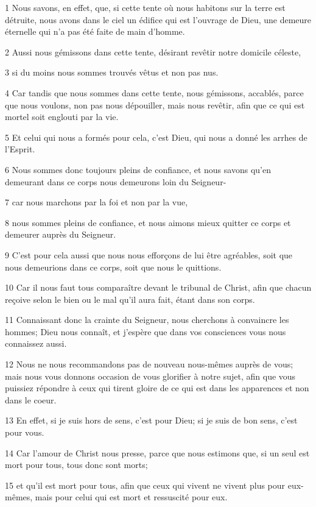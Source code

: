 \par 1 Nous savons, en effet, que, si cette tente où nous habitons sur la terre est détruite, nous avons dans le ciel un édifice qui est l'ouvrage de Dieu, une demeure éternelle qui n'a pas été faite de main d'homme.
\par 2 Aussi nous gémissons dans cette tente, désirant revêtir notre domicile céleste,
\par 3 si du moins nous sommes trouvés vêtus et non pas nus.
\par 4 Car tandis que nous sommes dans cette tente, nous gémissons, accablés, parce que nous voulons, non pas nous dépouiller, mais nous revêtir, afin que ce qui est mortel soit englouti par la vie.
\par 5 Et celui qui nous a formés pour cela, c'est Dieu, qui nous a donné les arrhes de l'Esprit.
\par 6 Nous sommes donc toujours pleins de confiance, et nous savons qu'en demeurant dans ce corps nous demeurons loin du Seigneur-
\par 7 car nous marchons par la foi et non par la vue,
\par 8 nous sommes pleins de confiance, et nous aimons mieux quitter ce corps et demeurer auprès du Seigneur.
\par 9 C'est pour cela aussi que nous nous efforçons de lui être agréables, soit que nous demeurions dans ce corps, soit que nous le quittions.
\par 10 Car il nous faut tous comparaître devant le tribunal de Christ, afin que chacun reçoive selon le bien ou le mal qu'il aura fait, étant dans son corps.
\par 11 Connaissant donc la crainte du Seigneur, nous cherchons à convaincre les hommes; Dieu nous connaît, et j'espère que dans vos consciences vous nous connaissez aussi.
\par 12 Nous ne nous recommandons pas de nouveau nous-mêmes auprès de vous; mais nous vous donnons occasion de vous glorifier à notre sujet, afin que vous puissiez répondre à ceux qui tirent gloire de ce qui est dans les apparences et non dans le coeur.
\par 13 En effet, si je suis hors de sens, c'est pour Dieu; si je suis de bon sens, c'est pour vous.
\par 14 Car l'amour de Christ nous presse, parce que nous estimons que, si un seul est mort pour tous, tous donc sont morts;
\par 15 et qu'il est mort pour tous, afin que ceux qui vivent ne vivent plus pour eux-mêmes, mais pour celui qui est mort et ressuscité pour eux.
